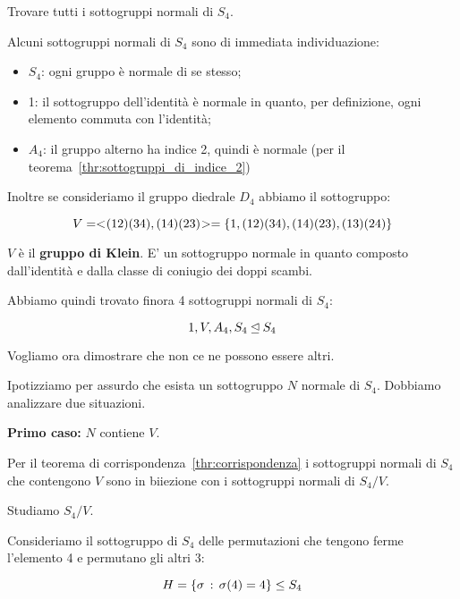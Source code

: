 \begin{esercizio}
	Trovare tutti i sottogruppi normali di $S_4$.
\end{esercizio}
\begin{soluzione}
	Alcuni sottogruppi normali di $S_4$ sono di immediata individuazione:
	
	\begin{itemize}
		\item $S_4$: ogni gruppo è normale di se stesso;
		\item 1: il sottogruppo dell'identità è normale in quanto, per definizione, ogni elemento commuta con l'identità;
		\item $A_4$: il gruppo alterno ha indice 2, quindi è normale (per il teorema~\ref{thr:sottogruppi_di_indice_2})
	\end{itemize}

	Inoltre se consideriamo il gruppo diedrale $D_4$ abbiamo il sottogruppo:
	
	\begin{equation}
		V = < \negmedspace (12)(34), (14)(23) \negmedspace > = \{1, (12)(34), (14)(23), (13)(24)\}
	\end{equation}

	$V$ è il \textbf{gruppo di Klein}. E' un sottogruppo normale in quanto composto dall'identità e dalla classe di coniugio dei doppi scambi.
	
	Abbiamo quindi trovato finora 4 sottogruppi normali di $S_4$:
	
	\begin{equation}
		1, V, A_4, S_4 \unlhd S_4
	\end{equation}

	Vogliamo ora dimostrare che non ce ne possono essere altri.
	
	Ipotizziamo per assurdo che esista un sottogruppo $N$ normale di $S_4$. Dobbiamo analizzare due situazioni.
	
	\textbf{Primo caso:} $N$ contiene $V$.
	
	Per il teorema di corrispondenza~\ref{thr:corrispondenza} i sottogruppi normali di $S_4$ che contengono $V$ sono in biiezione con i sottogruppi normali di $S_4/V$.
	
	Studiamo $S_4/V$.
	
	Consideriamo il sottogruppo di $S_4$ delle permutazioni che tengono ferme l'elemento 4 e permutano gli altri 3:
	
	\begin{equation}
		H = \{\sigma \,:\, \sigma(4) = 4\} \le S_4
	\end{equation}


\end{soluzione}
